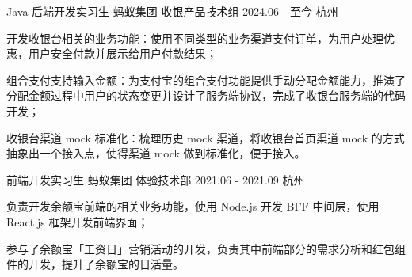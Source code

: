 

\begin{cventries}

  \cventry
    {Java 后端开发实习生} %
    {蚂蚁集团 \quad 收银产品技术组} %
    {2024.06 - 至今} %
    {杭州} %
    {
      \begin{cvitems} %
        \item {开发收银台相关的业务功能：使用不同类型的业务渠道支付订单，为用户处理优惠，用户安全付款并展示给用户付款结果；}
        \item {组合支付支持输入金额：为支付宝的组合支付功能提供手动分配金额能力，推演了分配金额过程中用户的状态变更并设计了服务端协议，完成了收银台服务端的代码开发；}
        \item {收银台渠道 mock 标准化：梳理历史 mock 渠道，将收银台首页渠道 mock 的方式抽象出一个接入点，使得渠道 mock 做到标准化，便于接入。}
      \end{cvitems}
    }

  \cventry
    {前端开发实习生} %
    {蚂蚁集团 \quad 体验技术部} %
    {2021.06 - 2021.09} %
    {杭州} %
    {
      \begin{cvitems} %
        \item {负责开发余额宝前端的相关业务功能，使用 Node.js 开发 BFF 中间层，使用 React.js 框架开发前端界面；}
        \item {参与了余额宝「工资日」营销活动的开发，负责其中前端部分的需求分析和红包组件的开发，提升了余额宝的日活量。}
      \end{cvitems}
    }


\end{cventries}
